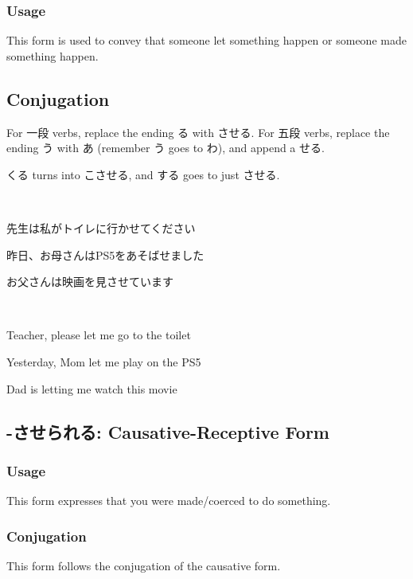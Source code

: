 \documentclass{article}
\begin{document}
\begin{CJK}{UTF8}{min}
\subsubsection{Usage}

This form is used to convey that someone let something happen or someone made something happen. 

\subsection{Conjugation}

For 一段 verbs, replace the ending る with させる. For 五段 verbs, replace the ending う with あ (remember う goes to わ), and append a せる.

くる turns into こさせる, and する goes to just させる.
\begin{example}
\ 

先生は私がトイレに行かせてください

昨日、お母さんはPS5をあそばせました

お父さんは映画を見させています
\end{example}

\begin{solution}
\ 

Teacher, please let me go to the toilet

Yesterday, Mom let me play on the PS5

Dad is letting me watch this movie

\end{solution}

\subsection{-させられる: Causative-Receptive Form}

\subsubsection{Usage}

This form expresses that you were made/coerced to do something.

\subsubsection{Conjugation}

This form follows the conjugation of the causative form.

\begin{example}
\ 


\end{example}
\end{CJK}
\end{document}
